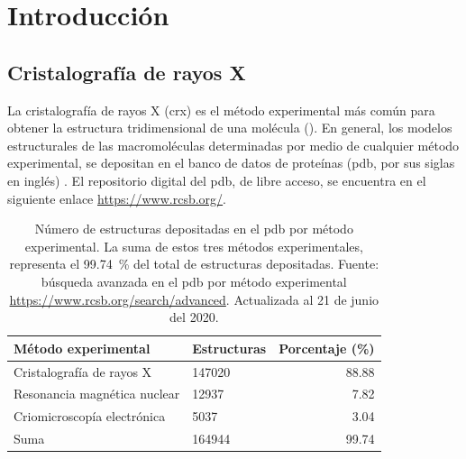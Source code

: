 \chapter{Introducción}
\section{Cristalografía de rayos X}
La cristalografía de rayos X (\acrshort{crx}) es el método experimental más común para obtener la estructura tridimensional de una molécula (). En general, los modelos estructurales de las macromoléculas determinadas por medio de cualquier método experimental, se depositan en el banco de datos de proteínas (\acrshort{pdb}, por sus siglas en inglés) . El repositorio digital del \acrshort{pdb}, de libre acceso, se encuentra en el siguiente enlace \url{https://www.rcsb.org/}. 

\begin{table}[h]
	\centering
	\begin{tabular}{@{}llr@{}}
		\toprule
		Método experimental & Estructuras  & Porcentaje (\si{\percent})       \\ 
		\midrule
		Cristalografía de rayos X & 147020 & 88.88	\\
		Resonancia magnética nuclear & 12937  & 7.82		\\
		Criomicroscopía electrónica & 5037   & 3.04		\\
		Suma   & 164944 & 99.74		\\ \bottomrule
	\end{tabular}%
	\caption[Número de estructuras por método experimental]{Número de estructuras depositadas en el \acrshort{pdb} por método experimental. La suma de estos tres métodos experimentales, representa el \SI{99.74}{\percent} del total de estructuras depositadas. Fuente: búsqueda avanzada en el \acrshort{pdb} por método experimental \url{https://www.rcsb.org/search/advanced}. Actualizada al 21 de junio del 2020.}
\end{table}

